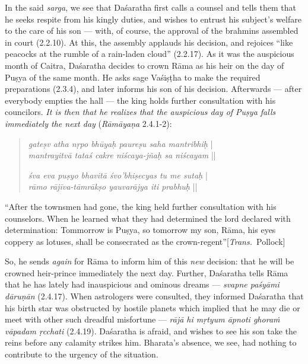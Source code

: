 In the said {\sl sarga}, we see that Daśaratha first calls a counsel and tells them that he seeks respite from his kingly duties, and wishes to entrust his subject’s welfare to the care of his son --- with, of course, the approval of the brahmins assembled in court (2.2.10). At this, the assembly applauds his decision, and rejoices “like peacocks at the rumble of a rain-laden cloud” (2.2.17). As it was the auspicious month of Caitra, Daśaratha decides to crown Rāma as his heir on the day of Puṣya of the same month. He asks sage Vaśiṣṭha to make the required preparations (2.3.4), and later informs his son of his decision. Afterwards --- after everybody empties the hall --- the king holds further consultation with his councilors. {\sl It is then that he realizes that the auspicious day of Puṣya falls immediately the next day} ({\sl Rāmāyaṇa} 2.4.1-2):

\begin{quote}
{{\sl gateṣv atha nṛpo bhūyaḥ paureṣu saha mantribhiḥ}}\label{verse7} |\\
{{\sl mantrayitvā tataś cakre niścaya-jñaḥ sa niścayam}} ||

{\sl śva eva puṣyo bhavitā śvo’bhiṣecyas tu me sutaḥ}\label{verse8} |\\
{\sl rāmo rājīva-tāmrākṣo yauvarājya iti prabhuḥ} ||
\end{quote}

\begin{myquote}
“After the townsmen had gone, the king held further consultation with his counselors. When he learned what they had determined the lord declared with determination: Tommorrow is Puṣya, so tomorrow my son, Rāma, his eyes coppery as lotuses, shall be consecrated as the crown-regent”\hfill \hbox{[{\sl Trans.} Pollock]}
\end{myquote}

So, he sends {\sl again} for Rāma to inform him of this {\sl new} decision: that he will be crowned heir-prince immediately the next day. Further, Daśaratha tells Rāma that he has lately had inauspicious and ominous dreams --- {\sl svapne paśyāmi dāruṇān}\label{verse9} (2.4.17). When astrologers were consulted, they informed Daśaratha that his birth star was obstructed by hostile planets which implied that he may die or meet with other such dreadful misfortune --- {\sl rājā hi mṛtyum āpnoti\label{verse10} ghoraṁ vāpadam ṛcchati} (2.4.19). Daśaratha is afraid, and wishes to see his son take the reins before any calamity strikes him. Bharata’s absence, we see, had nothing to contribute to the urgency of the situation. 

